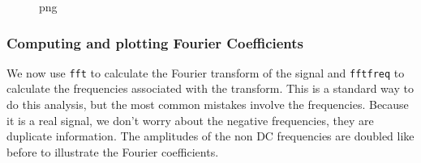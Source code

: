 \begin{figure}
\centering
{}
\caption{png}
\end{figure}

\subsubsection{Computing and plotting Fourier
Coefficients}\label{computing-and-plotting-fourier-coefficients}

We now use \texttt{fft} to calculate the Fourier transform of the signal
and \texttt{fftfreq} to calculate the frequencies associated with the
transform. This is a standard way to do this analysis, but the most
common mistakes involve the frequencies. Because it is a real signal, we
don't worry about the negative frequencies, they are duplicate
information. The amplitudes of the non DC frequencies are doubled like
before to illustrate the Fourier coefficients.

\begin{Shaded}
\begin{Highlighting}[]
\OperatorTok{=}
\OperatorTok{=}\NormalTok{ summed[:}\NormalTok{(t\_)] }
\OperatorTok{=} \OperatorTok{/}\OperatorTok{/}\NormalTok{) }

\OperatorTok{=}
\OperatorTok{=}

\OperatorTok{=}
\OperatorTok{=}\OperatorTok{*}\NormalTok{(fft\_summed[}\NormalTok{:N]), }\NormalTok{(fft\_summed[}\NormalTok{]))}
\end{Highlighting}
\end{Shaded}

